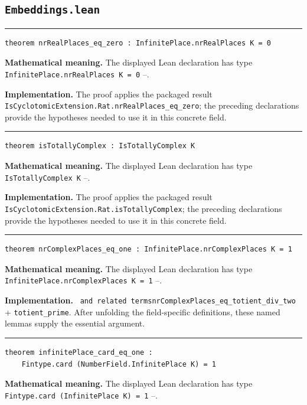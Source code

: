 \documentclass[UTF8,a4paper,11pt,fontset=fandol]{ctexart}
\theoremstyle{definition}
\newcommand{\statementsep}{\par\medskip\hrule\medskip}
\begin{document}
\subsection{\texttt{Embeddings.lean}}

\statementsep
\begin{verbatim}
theorem nrRealPlaces_eq_zero : InfinitePlace.nrRealPlaces K = 0
\end{verbatim}
\noindent\textbf{Mathematical meaning.} The displayed Lean declaration has type \texttt{InfinitePlace.\allowbreak{}nrRealPlaces K = 0} --.\par
\noindent\textbf{Implementation.} The proof applies the packaged result \texttt{IsCyclotomicExtension.\allowbreak{}Rat.\allowbreak{}nrRealPlaces\_\allowbreak{}eq\_\allowbreak{}zero}; the preceding declarations provide the hypotheses needed to use it in this concrete field.\par
\statementsep
\begin{verbatim}
theorem isTotallyComplex : IsTotallyComplex K
\end{verbatim}
\noindent\textbf{Mathematical meaning.} The displayed Lean declaration has type \texttt{IsTotallyComplex K} --.\par
\noindent\textbf{Implementation.} The proof applies the packaged result \texttt{IsCyclotomicExtension.\allowbreak{}Rat.\allowbreak{}isTotallyComplex}; the preceding declarations provide the hypotheses needed to use it in this concrete field.\par
\statementsep
\begin{verbatim}
theorem nrComplexPlaces_eq_one : InfinitePlace.nrComplexPlaces K = 1
\end{verbatim}
\noindent\textbf{Mathematical meaning.} The displayed Lean declaration has type \texttt{InfinitePlace.\allowbreak{}nrComplexPlaces K = 1} --.\par
\noindent\textbf{Implementation.} \texttt{ and related termsnrComplexPlaces\_\allowbreak{}eq\_\allowbreak{}totient\_\allowbreak{}div\_\allowbreak{}two} + \texttt{totient\_\allowbreak{}prime}. After unfolding the field-specific definitions, these named lemmas supply the essential argument.\par
\statementsep
\begin{verbatim}
theorem infinitePlace_card_eq_one :
    Fintype.card (NumberField.InfinitePlace K) = 1
\end{verbatim}
\noindent\textbf{Mathematical meaning.} The displayed Lean declaration has type \texttt{Fintype.\allowbreak{}card (InfinitePlace K) = 1} --.\par
\end{document}
